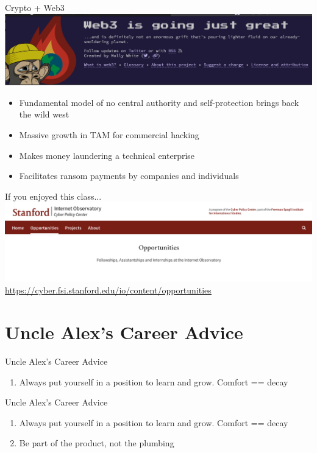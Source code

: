\documentclass[nobackground,dvipsnames,table,aspectratio=169]{beamer}
\begin{document}
\begin{frame}{Crypto + Web3}
    \includegraphics[width=\textwidth]{web3}
    \begin{itemize}
        \item Fundamental model of no central authority and self-protection brings back the wild west
        \item Massive growth in TAM for commercial hacking
        \item Makes money laundering a technical enterprise
        \item Facilitates ransom payments by companies and individuals
    \end{itemize}
\end{frame}

\begin{frame}{If you enjoyed this class...}
    \includegraphics[width=\textwidth]{sio-opportunities}
    \underline{\url{https://cyber.fsi.stanford.edu/io/content/opportunities}}
\end{frame}

\section{Uncle Alex's Career Advice}

\begin{frame}{Uncle Alex's Career Advice}
    \begin{enumerate}
        \item Always put yourself in a position to learn and grow. Comfort == decay
    \end{enumerate}
\end{frame}

\begin{frame}{Uncle Alex's Career Advice}
    \begin{enumerate}
        \item Always put yourself in a position to learn and grow. Comfort == decay
        \item Be part of the product, not the plumbing
    \end{enumerate}
\end{frame}
\end{document}
